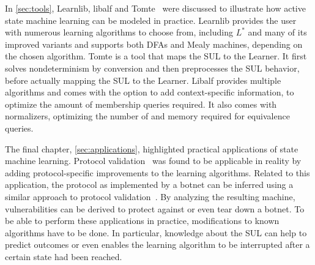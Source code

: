 \documentclass[multi,crop=false,class=article]{standalone}
\begin{document}
In \cref{sec:tools}, Learnlib, libalf and Tomte~\cite{Raffelt2009,Bollig2010,Tomte2014}
were discussed to illustrate how active state machine learning can be modeled in
practice. Learnlib provides the user with numerous learning algorithms to choose
from, including $L^*$ and many of its improved variants and supports both DFAs
and Mealy machines, depending on the chosen algorithm. Tomte is a tool that maps
the SUL to the Learner. It first solves nondeterminism by conversion and then
preprocesses the SUL behavior, before actually mapping the SUL to the Learner.
Libalf provides multiple algorithms and comes with the option to add
context-specific information, to optimize the amount of membership queries
required. It also comes with normalizers, optimizing the number of and memory
required for equivalence queries.

The final chapter, \cref{sec:applications}, highlighted practical applications of state
machine learning. Protocol validation~\cite{deRuiter2015} was found to be
applicable in reality by adding protocol-specific improvements to the
learning algorithms. Related to this application, the protocol as implemented
by a botnet can be inferred using a similar approach to protocol
validation~\cite{Chow2010}. By analyzing the resulting machine, vulnerabilities
can be derived to protect against or even tear down a botnet.
To be able to perform these applications in practice, modifications to known
algorithms have to be done. In particular, knowledge about the SUL can help to
predict outcomes or even enables the learning algorithm to be interrupted after
a certain state had been reached.
\end{document}
